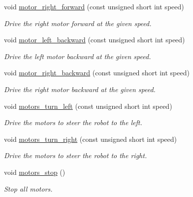\begin{DoxyCompactItemize}
void \hyperlink{classIDP_1_1HardwareAbstractionLayer_aa2e2e226f2313d769e3ce226dd24d22c}{motor\_\-right\_\-forward} (const unsigned short int speed)
\begin{DoxyCompactList}\small\item\em Drive the right motor forward at the given speed. \item\end{DoxyCompactList}\item 
void \hyperlink{classIDP_1_1HardwareAbstractionLayer_a61b80e2bad5cc6a56a17350b015bfbcc}{motor\_\-left\_\-backward} (const unsigned short int speed)
\begin{DoxyCompactList}\small\item\em Drive the left motor backward at the given speed. \item\end{DoxyCompactList}\item 
void \hyperlink{classIDP_1_1HardwareAbstractionLayer_aac42c10ca431120a060f9b2c394492ae}{motor\_\-right\_\-backward} (const unsigned short int speed)
\begin{DoxyCompactList}\small\item\em Drive the right motor backward at the given speed. \item\end{DoxyCompactList}\item 
void \hyperlink{classIDP_1_1HardwareAbstractionLayer_ae38aaced2f082b6b04ebdd662349b1d2}{motors\_\-turn\_\-left} (const unsigned short int speed)
\begin{DoxyCompactList}\small\item\em Drive the motors to steer the robot to the left. \item\end{DoxyCompactList}\item 
void \hyperlink{classIDP_1_1HardwareAbstractionLayer_ad1fba0e8cb2c9ad902c8e4ec34e5e622}{motors\_\-turn\_\-right} (const unsigned short int speed)
\begin{DoxyCompactList}\small\item\em Drive the motors to steer the robot to the right. \item\end{DoxyCompactList}\item 
void \hyperlink{classIDP_1_1HardwareAbstractionLayer_a4f8f0340f3ac64c3f676b700b7e36229}{motors\_\-stop} ()
\begin{DoxyCompactList}\small\item\em Stop all motors. \item\end{DoxyCompactList}\item 

\end{DoxyCompactItemize}
